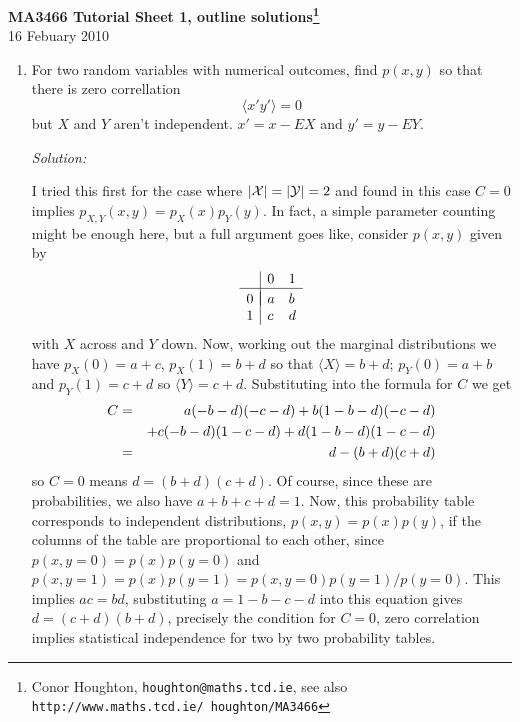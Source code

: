 \documentclass[12pt]{article}
\newcommand{\soln}{\noindent\textit{Solution:}}
\begin{document}
\begin{center}
{\bf MA3466 Tutorial Sheet 1, outline solutions\footnote{Conor Houghton, {\tt houghton@maths.tcd.ie}, see also {\tt http://www.maths.tcd.ie/ houghton/MA3466}}}\\[1cm]{} 16 Febuary 2010
\end{center}
\begin{enumerate}

\item For two random variables with numerical outcomes, find $p(x,y)$ so that there is zero correllation
\begin{equation}
\langle x'y'\rangle=0 
\end{equation}
but $X$ and $Y$ aren't independent. $x'=x-EX$ and $y'=y-EY$. 

\soln


I tried this first for the case where $|{\cal X}|=|{\cal Y}|=2$ and
found in this case $C=0$ implies $p_{X,Y}(x,y)=p_X(x)p_Y(y)$. In fact,
a simple parameter counting might be enough here, but a full argument
goes like, consider $p(x,y)$ given by
\begin{equation}
\begin{array}{l|ll}
&0&1\\
\hline\\[-10pt]
0&a&b\\
1&c&d
\end{array}
\end{equation}
with $X$ across and $Y$ down. Now, working out the marginal
distributions we have $p_X(0)=a+c$, $p_X(1)=b+d$ so that $\langle X\rangle=b+d$;
$p_Y(0)=a+b$ and $p_Y(1)=c+d$ so $\langle Y\rangle=c+d$. Substituting into the formula for $C$ we get
\begin{eqnarray}
C&=&a(-b-d)(-c-d)+
b(1-b-d)(-c-d)\cr&&+
c(-b-d)(1-c-d)+
d(1-b-d)(1-c-d)\cr
&=&d-(b+d)(c+d)
\end{eqnarray}
so $C=0$ means $d=(b+d)(c+d)$. Of course, since these are
probabilities, we also have $a+b+c+d=1$. Now, this probability table
corresponds to independent distributions, $p(x,y)=p(x)p(y)$, if the
columns of the table are proportional to each other, since
$p(x,y=0)=p(x)p(y=0)$ and
$p(x,y=1)=p(x)p(y=1)=p(x,y=0)p(y=1)/p(y=0)$. This implies $ac=bd$,
substituting $a=1-b-c-d$ into this equation gives $d=(c+d)(b+d)$,
precisely the condition for $C=0$, zero correlation implies
statistical independence for two by two probability tables.


\end{enumerate}
\end{document}
